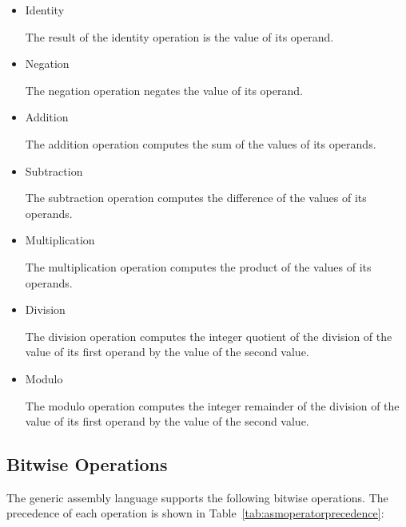 \newcommand{\asmoperator}[1]{\item #1\alignright\nopagebreak}

\begin{itemize}

\asmoperator{Identity}

The result of the identity operation is the value of its operand.

\asmoperator{Negation}

The negation operation negates the value of its operand.

\asmoperator{Addition}

The addition operation computes the sum of the values of its operands.

\asmoperator{Subtraction}

The subtraction operation computes the difference of the values of its operands.

\asmoperator{Multiplication}

The multiplication operation computes the product of the values of its operands.

\asmoperator{Division}

The division operation computes the integer quotient of the division of the value of its first operand by the value of the second value.

\asmoperator{Modulo}

The modulo operation computes the integer remainder of the division of the value of its first operand by the value of the second value.

\end{itemize}

\subsection{Bitwise Operations}

The generic assembly language supports the following bitwise operations.
The precedence of each operation is shown in Table~\ref{tab:asmoperatorprecedence}:

